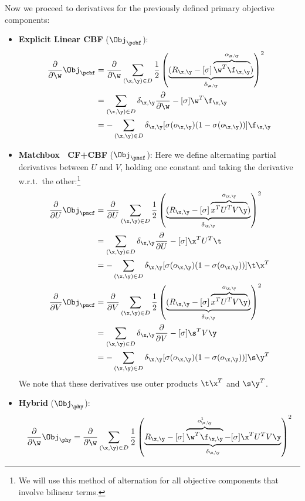 Now we proceed to derivatives for the previously defined primary
objective components:
\begin{itemize}
\item {\bf Explicit Linear CBF} ($\Obj_\pcbf$):
\begin{align*}
\frac{\partial}{\partial \w} \Obj_\pcbf & = \frac{\partial}{\partial \w} \sum_{(\x,\y) \in D} \frac{1}{2} \left( \underbrace{(R_{\x,\y} - [\sigma] \overbrace{\w^T \f_{\x,\y}}^{o_{\x,\y}})}_{\delta_{\x,\y}} \right)^2\\
& = \sum_{(\x,\y) \in D} \delta_{\x,\y} \frac{\partial}{\partial \w} - [\sigma] \w^T \f_{\x,\y}\\
& = - \sum_{(\x,\y) \in D} \delta_{\x,\y} [\sigma(o_{\x,\y}) (1 - \sigma(o_{\x,\y}))] \f_{\x,\y}
\end{align*}
\item {\bf Matchbox~\cite{matchbox} CF+CBF} ($\Obj_\pmcf$):
Here we define alternating partial derivatives between $U$ and $V$, holding one
constant and taking the derivative w.r.t.\ the other:\footnote{We will use
this method of alternation for all objective components that involve bilinear
terms.}
\begin{align*}
\frac{\partial}{\partial U} \Obj_\pmcf & = \frac{\partial}{\partial U} \sum_{(\x,\y) \in D} \frac{1}{2} \left( \underbrace{(R_{\x,\y} - [\sigma] \overbrace{x^T U^T V\y}^{o_{\x,\y}})}_{\delta_{\x,\y}} \right)^2\\
& = \sum_{(\x,\y) \in D} \delta_{\x,\y} \frac{\partial}{\partial U} - [\sigma] \x^T U^T \t \\
& = - \sum_{(\x,\y) \in D} \delta_{\x,\y} [\sigma(o_{\x,\y}) (1 - \sigma(o_{\x,\y}))] \t \x^T \\
\frac{\partial}{\partial V} \Obj_\pmcf & = \frac{\partial}{\partial V} \sum_{(\x,\y) \in D} \frac{1}{2} \left( \underbrace{(R_{\x,\y} - [\sigma] \overbrace{x^T U^T V\y}^{o_{\x,\y}})}_{\delta_{\x,\y}} \right)^2\\
& = \sum_{(\x,\y) \in D} \delta_{\x,\y} \frac{\partial}{\partial V} - [\sigma] \s^T V \y \\
& = - \sum_{(\x,\y) \in D} \delta_{\x,\y} [\sigma(o_{\x,\y}) (1 - \sigma(o_{\x,\y}))] \s \y^T
\end{align*}
We note that these derivatives use outer products $\t \x^T$ and $\s \y^T$.
\item {\bf Hybrid} ($\Obj_\phy$):
\begin{align*}
\frac{\partial}{\partial \w} \Obj_\phy & = \frac{\partial}{\partial \w} \sum_{(\x,\y) \in D} \frac{1}{2} \left( \underbrace{R_{\x,\y} - [\sigma] \overbrace{\w^T \f_{\x,\y}}^{o^1_{\x,\y}} - [\sigma] \x^T U^T V\y}_{\delta_{\x,\y}} \right)^2 \\

\end{align*}
\end{itemize}
